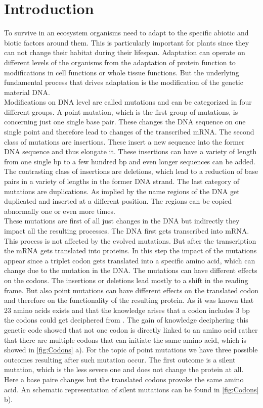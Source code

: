 \chapter{Introduction}
To survive in an ecosystem organisms need to adapt to the specific abiotic and biotic factors around them. This is particularly important for plants since they can not change their habitat during their lifespan. Adaptation can operate on different levels of the organisms from the adaptation of protein function to modifications in cell functions or whole tissue functions. But the underlying fundamental process that drives adaptation is the modification of the genetic material DNA.\\
Modifications on DNA level are called mutations and can be categorized in four different groups. A point mutation, which is the first group of mutations, is concerning just one single base pair. These changes the DNA sequence on one single point and therefore lead to changes of the transcribed mRNA. The second class of mutations are insertions. These insert a new sequence into the former DNA sequence and thus elongate it. These insertions can have a variety of length from one single bp to a few hundred bp and even longer sequences can be added.  The contrasting class of insertions are deletions, which lead to a reduction of base pairs in a variety of lengths in the former DNA strand. The last category of mutations are duplications. As implied by the name regions of the DNA get duplicated and inserted at a different position. The regions can be copied abnormally one or even more times.\\
These mutations are first of all just changes in the DNA but indirectly they impact all the resulting processes. The DNA first gets transcribed into mRNA. This process is not affected by the evolved mutations. But after the transcription the mRNA gets translated into proteins. In this step the impact of the mutations appear since a triplet codon gets translated into a specific amino acid, which can change due to the mutation in the DNA. The mutations can have different effects on the codons. The insertions or deletions lead mostly to a shift in the reading frame. But also point mutations can have different effects on the translated codon and therefore on the functionality of the resulting protein. As it was known that 23 amino acids exists and that the knowledge arises that a codon includes 3 bp the codons could get deciphered from \textcite{Nirenberg1965}. The gain of knowledge deciphering this genetic code showed that not one codon is directly linked to an amino acid rather that there are multiple codons that can initiate the same amino acid, which is showed in \autoref{fig:Codons} a). For the topic of point mutations we have three possible outcomes resulting after such mutation occur. The first outcome is a silent mutation, which is the less severe one and does not change the protein at all. Here a base paire changes but the translated codons provoke the same amino acid. An schematic representation of silent mutations can be found in \autoref{fig:Codons} b). 
